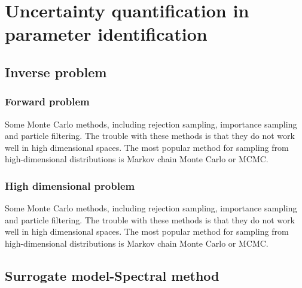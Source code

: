 \chapter{Uncertainty quantification in parameter identification}

\label{UQ}
\section{Inverse problem}
\subsection{Forward problem}

Some Monte Carlo methods, including rejection sampling, importance sampling and particle filtering. The trouble with these methods is that they do not work well in high
dimensional spaces. The most popular method for sampling from high-dimensional distributions
is Markov chain Monte Carlo or MCMC.
\subsection{High dimensional problem}

Some Monte Carlo methods, including rejection sampling, importance sampling and particle filtering. The trouble with these methods is that they do not work well in high
dimensional spaces. The most popular method for sampling from high-dimensional distributions
is Markov chain Monte Carlo or MCMC.
\section{Surrogate model-Spectral method}

